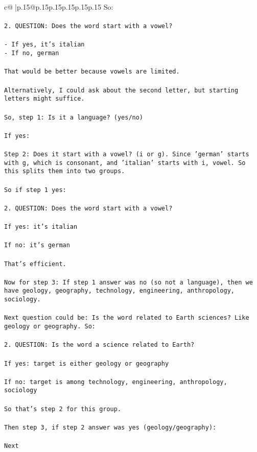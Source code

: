 \documentclass{article}
\begin{document}
{\begin{supertabular}{c@{$\;$}|p{.15\linewidth}@{}p{.15\linewidth}p{.15\linewidth}p{.15\linewidth}p{.15\linewidth}p{.15\linewidth}}
{{{So:\\ \tt \\ \tt 2. QUESTION: Does the word start with a vowel?\\ \tt \\ \tt - If yes, it's italian\\ \tt - If no, german\\ \tt \\ \tt That would be better because vowels are limited.\\ \tt \\ \tt Alternatively, I could ask about the second letter, but starting letters might suffice.\\ \tt \\ \tt So, step 1: Is it a language? (yes/no)\\ \tt \\ \tt If yes:\\ \tt \\ \tt Step 2: Does it start with a vowel? (i or g). Since 'german' starts with g, which is consonant, and 'italian' starts with i, vowel. So this splits them into two groups.\\ \tt \\ \tt So if step 1 yes:\\ \tt \\ \tt 2. QUESTION: Does the word start with a vowel?\\ \tt \\ \tt If yes: it's italian\\ \tt \\ \tt If no: it's german\\ \tt \\ \tt That's efficient.\\ \tt \\ \tt Now for step 3: If step 1 answer was no (so not a language), then we have geology, geography, technology, engineering, anthropology, sociology.\\ \tt \\ \tt Next question could be: Is the word related to Earth sciences? Like geology or geography. So:\\ \tt \\ \tt 2. QUESTION: Is the word a science related to Earth?\\ \tt \\ \tt If yes: target is either geology or geography\\ \tt \\ \tt If no: target is among technology, engineering, anthropology, sociology\\ \tt \\ \tt So that's step 2 for this group.\\ \tt \\ \tt Then step 3, if step 2 answer was yes (geology/geography):\\ \tt \\ \tt Next }}}
\end{supertabular}}
\end{document}
